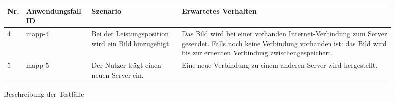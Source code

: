 \begin{figure}[!h]
	\begin{center}
		\begin{tabularx}{\textwidth}{ p{} | p{} | p{} | X }
			\textbf{Nr.} & \textbf{Anwendungsfall ID} & \textbf{Szenario} & \textbf{Erwartetes Verhalten} \\ \hline
			4 & mapp-4 & Bei der Leistungsposition wird ein Bild hinzugefügt. & Das Bild wird bei einer vorhanden Internet-Verbindung zum Server gesendet. Falls noch keine Verbindung vorhanden ist: das Bild wird bis zur erneuten Verbindung zwischengespeichert. \\ \hline
			5 & mapp-5 & Der Nutzer trägt einen neuen Server ein. & Eine neue Verbindung zu einem anderen Server wird hergestellt. \\ \hline
		\end{tabularx}	
	\end{center}
	\caption{Beschreibung der Testfälle}
	\label{fig:testfaelle-mobile-app-tabelle}
\end{figure}

